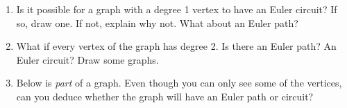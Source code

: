 \documentclass{book}
\begin{document}
\begin{activity}[]
\begin{enumerate}[font=\bfseries,label=(\alph*),ref=\alph*]
\item\label{task-6} \hypertarget{p-142}{}%
Is it possible for a graph with a degree 1 vertex to have an Euler circuit? If so, draw one. If not, explain why not. What about an Euler path?%
\item\label{task-7} \hypertarget{p-143}{}%
What if every vertex of the graph has degree 2. Is there an Euler path? An Euler circuit? Draw some graphs.%
\item\label{task-8} \hypertarget{p-144}{}%
Below is \emph{part} of a graph. Even though you can only see some of the vertices, can you deduce whether the graph will have an Euler path or circuit?%
\begin{sidebyside}{1}{0.23}{0.23}{0}
\begin{sbspanel}{0.54}
\end{sbspanel}
\end{sidebyside}
\end{enumerate}
\end{activity}

\clearpage
\end{document}

